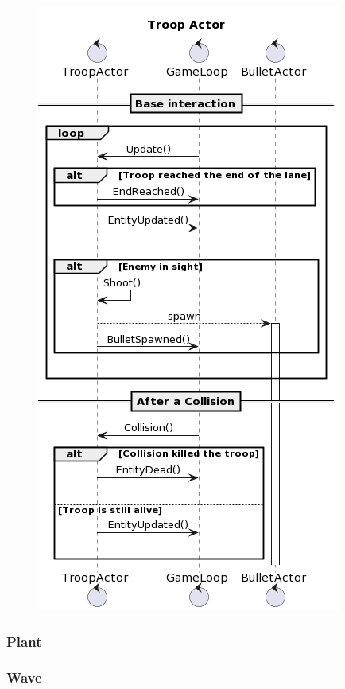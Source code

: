 \begin{figure}[H]
    \centering
    \includegraphics[width=\linewidth]{images/troop-actor.png}
    \label{Diagramma di sequenza del Troop Actor.}
\end{figure}

\subsubsection{Plant}


\subsubsection{Wave}